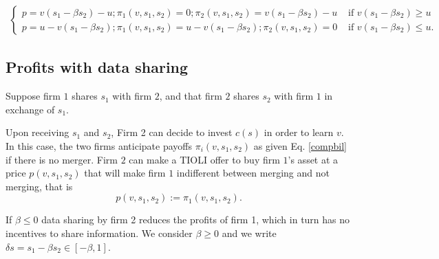 \documentclass[a4paper,leqno]{article}%
\begin{document}
\begin{align}
\begin{cases}
    p=v (s_1-\beta s_2)-u ; \pi_1(v,s_1,s_2)=0 ; \pi_2(v,s_1,s_2)=v(s_1-\beta s_2)-u & \text{ if }v (s_1-\beta s_2)\geq u\\ 
    p=u-v (s_1-\beta s_2) ; \pi_1(v,s_1,s_2)=u-v(s_1-\beta s_2); \pi_2(v,s_1,s_2)=0 & \text{ if }v (s_1-\beta s_2)\leq u.
\end{cases}
\end{align}


\subsection{Profits with data sharing}

Suppose firm $1$ shares $s_1$ with firm $2$, and that firm $2$ shares $s_2$ with firm $1$ in exchange of $s_1$. 

Upon receiving $s_1$ and $s_2$, Firm 2 can decide to invest $c(s)$ in order to learn $v$. In this case, the two firms anticipate payoffs $\pi_i(v, s_1,s_2)$ as given  Eq. \eqref{compbil} if there is no merger. Firm $2$ can make a TIOLI offer to buy firm $1$'s asset at a price $p(v, s_1,s_2)$ that will make firm $1$ indifferent between merging and not merging, that is 
%
\begin{equation}
    p(v, s_1,s_2):=\pi_1(v, s_1,s_2).  
\end{equation}


If $\beta\leq 0$ data sharing by firm 2 reduces the profits of firm 1, which in turn has no incentives to share information. We consider $\beta\geq 0$ and we write $\delta s=s_1-\beta s_2\in [-\beta,1]$.
\end{document}
